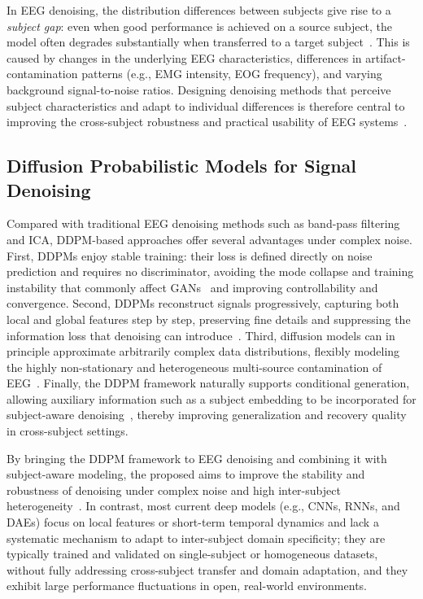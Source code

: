 In EEG denoising, the distribution differences between subjects give rise to a
\emph{subject gap}: even when good performance is achieved on a source subject,
the model often degrades substantially when transferred to a target
subject~\cite{chen2022openworld}. This is caused by changes in the underlying
EEG characteristics, differences in artifact-contamination patterns (e.g., EMG
intensity, EOG frequency), and varying background signal-to-noise ratios.
Designing denoising methods that perceive subject characteristics and adapt to
individual differences is therefore central to improving the cross-subject
robustness and practical usability of EEG systems~\cite{jia2025bimamba}.

\subsection{Diffusion Probabilistic Models for Signal Denoising}
\label{sec:related_diffusion}

Compared with traditional EEG denoising methods such as band-pass filtering and
ICA, DDPM-based approaches offer several advantages under complex noise. First,
DDPMs enjoy stable training: their loss is defined directly on noise prediction
and requires no discriminator, avoiding the mode collapse and training
instability that commonly affect GANs~\cite{ho2020ddpm} and improving
controllability and convergence. Second, DDPMs reconstruct signals
progressively, capturing both local and global features step by step,
preserving fine details and suppressing the information loss that denoising can
introduce~\cite{zhao2023ecg}. Third, diffusion models can in principle
approximate arbitrarily complex data distributions, flexibly modeling the
highly non-stationary and heterogeneous multi-source contamination of
EEG~\cite{zeng2023dmre2i}. Finally, the DDPM framework naturally supports
conditional generation, allowing auxiliary information such as a subject
embedding to be incorporated for subject-aware
denoising~\cite{choi2021ilvr}, thereby improving generalization and recovery
quality in cross-subject settings.

By bringing the DDPM framework to EEG denoising and combining it with
subject-aware modeling, the proposed \saddpm{} aims to improve the stability and
robustness of denoising under complex noise and high inter-subject
heterogeneity~\cite{zeng2023dmre2i}. In contrast, most current deep models
(e.g., CNNs, RNNs, and DAEs) focus on local features or short-term temporal
dynamics and lack a systematic mechanism to adapt to inter-subject domain
specificity; they are typically trained and validated on single-subject or
homogeneous datasets, without fully addressing cross-subject transfer and domain
adaptation, and they exhibit large performance fluctuations in open, real-world
environments.

